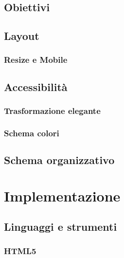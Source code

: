 \documentclass[a4paper]{article}
\begin{document}
		\subsection{Obiettivi}
			
		\subsection{Layout}
			
			\subsubsection{Resize e Mobile}
				
		\subsection{Accessibilità}
		 	
		 	\subsubsection{Trasformazione elegante}
		 		
		 	\subsubsection{Schema colori}
		 		
		\subsection{Schema organizzativo}
			

	\newpage

	\section{Implementazione}
		\subsection{Linguaggi e strumenti}
			
			\subsubsection{HTML5}
				
\end{document}
